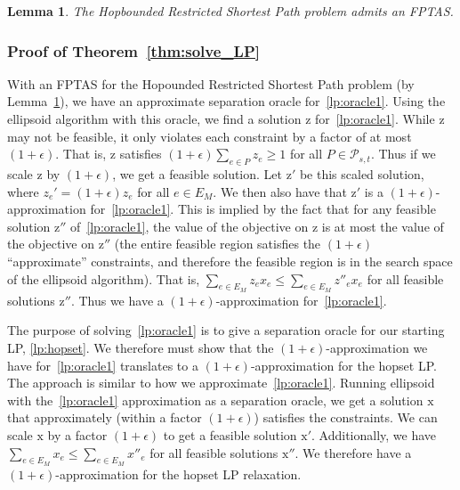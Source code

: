 \documentclass{article}
\newtheorem{lemma}[theorem]{Lemma}
\theoremstyle{definition}
\theoremstyle{remark}
\newcommand{\quotes}[1]{``#1''}
\begin{document}
\begin{lemma} \label{lem:FPTAS_HRSP}
    The Hopbounded Restricted Shortest Path problem admits an FPTAS.
\end{lemma}

\subsubsection{Proof of Theorem~\ref{thm:solve_LP}}
With an FPTAS for the Hopounded Restricted Shortest Path problem (by Lemma~\ref{lem:FPTAS_HRSP}), we have an approximate separation oracle for~\ref{lp:oracle1}. Using the ellipsoid algorithm with this oracle, we find a solution $\bm{\mathrm{z}}$ for~\ref{lp:oracle1}. While $\bm{\mathrm{z}}$ may not be feasible, it only violates each constraint by a factor of at most $(1+\epsilon)$. That is, $\bm{\mathrm{z}}$ satisfies $(1+\epsilon) \sum_{e \in P}  z_e \geq 1$ for all $P \in \mathcal{P}_{s,t}$. Thus if we scale $\bm{\mathrm{z}}$ by $(1+\epsilon)$, we get a feasible solution. Let $\bm{\mathrm{z'}}$ be this scaled solution, where $z_e' = (1+\epsilon) z_e$ for all $e \in E_M$. We then also have that $\bm{\mathrm{z'}}$ is a $(1+\epsilon)$-approximation for~\ref{lp:oracle1}. This is implied by the fact that for any feasible solution $\bm{\mathrm{z''}}$ of~\ref{lp:oracle1}, the value of the objective on $\bm{\mathrm{z}}$ is at most the value of the objective on $\bm{\mathrm{z''}}$ (the entire feasible region satisfies the $(1+\epsilon)$ \quotes{approximate} constraints, and therefore the feasible region is in the search space of the ellipsoid algorithm). That is, $\sum_{e \in E_M}  z_e x_e \leq \sum_{e \in E_M}  z''_e x_e$ for all feasible solutions $\bm{\mathrm{z''}}$.  Thus we have a $(1+\epsilon)$-approximation for~\ref{lp:oracle1}.

The purpose of solving~\ref{lp:oracle1} is to give a separation oracle for our starting LP, \ref{lp:hopset}. We therefore must show that the $(1+\epsilon)$-approximation we have for~\ref{lp:oracle1} translates to a $(1+\epsilon)$-approximation for the hopset LP. The approach is similar to how we approximate~\ref{lp:oracle1}. Running ellipsoid with the~\ref{lp:oracle1} approximation as a separation oracle, we get a solution $\bm{\mathrm{x}}$ that approximately (within a factor $(1+\epsilon)$) satisfies the constraints. We can scale $\bm{\mathrm{x}}$ by a factor $(1+\epsilon)$ to get a feasible solution $\bm{\mathrm{x'}}$. Additionally, we have $\sum_{e \in E_M} x_e \leq \sum_{e \in E_M} x''_e$ for all feasible solutions $\bm{\mathrm{x''}}$. We therefore have a $(1+\epsilon)$-approximation for the hopset LP relaxation. 
\end{document}
